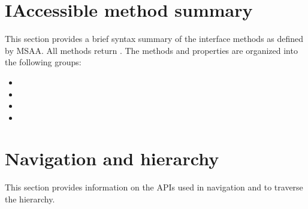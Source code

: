 \documentclass[letterpaper,12pt,english,openany,oneside]{sphinxmanual}
\begin{document}
\begin{sphinxVerbatim}[commandchars=\\\{\}]
   
    
     
             
\end{sphinxVerbatim}




\section{IAccessible method summary}
\label{\detokenize{MSAA_PDF:iaccessible-method-summary}}
This section provides a brief syntax summary of the  interface methods as defined by MSAA. All methods return  . The methods and properties are organized into the following groups:
\begin{itemize}
\item {} 

\item {} 

\item {} 

\item {} 

\end{itemize}




\section{Navigation and hierarchy}
\label{\detokenize{MSAA_PDF:navigation-and-hierarchy}}
This section provides information on the APIs used in navigation and to traverse the hierarchy.
\end{document}
